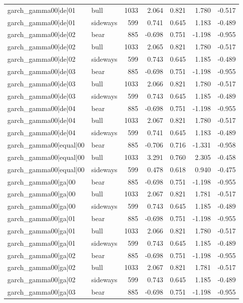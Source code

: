 \begin{table}
\begin{tabular}{llrrrrr}
garch\_gamma00|de|01 & bull & 1033 & 2.064 & 0.821 & 1.780 & -0.517 \\
garch\_gamma00|de|01 & sideways & 599 & 0.741 & 0.645 & 1.183 & -0.489 \\
garch\_gamma00|de|02 & bear & 885 & -0.698 & 0.751 & -1.198 & -0.955 \\
garch\_gamma00|de|02 & bull & 1033 & 2.065 & 0.821 & 1.780 & -0.517 \\
garch\_gamma00|de|02 & sideways & 599 & 0.743 & 0.645 & 1.185 & -0.489 \\
garch\_gamma00|de|03 & bear & 885 & -0.698 & 0.751 & -1.198 & -0.955 \\
garch\_gamma00|de|03 & bull & 1033 & 2.066 & 0.821 & 1.780 & -0.517 \\
garch\_gamma00|de|03 & sideways & 599 & 0.743 & 0.645 & 1.185 & -0.489 \\
garch\_gamma00|de|04 & bear & 885 & -0.698 & 0.751 & -1.198 & -0.955 \\
garch\_gamma00|de|04 & bull & 1033 & 2.067 & 0.821 & 1.780 & -0.517 \\
garch\_gamma00|de|04 & sideways & 599 & 0.741 & 0.645 & 1.183 & -0.489 \\
garch\_gamma00|equal|00 & bear & 885 & -0.706 & 0.716 & -1.331 & -0.958 \\
garch\_gamma00|equal|00 & bull & 1033 & 3.291 & 0.760 & 2.305 & -0.458 \\
garch\_gamma00|equal|00 & sideways & 599 & 0.478 & 0.618 & 0.940 & -0.475 \\
garch\_gamma00|ga|00 & bear & 885 & -0.698 & 0.751 & -1.198 & -0.955 \\
garch\_gamma00|ga|00 & bull & 1033 & 2.067 & 0.821 & 1.781 & -0.517 \\
garch\_gamma00|ga|00 & sideways & 599 & 0.743 & 0.645 & 1.185 & -0.489 \\
garch\_gamma00|ga|01 & bear & 885 & -0.698 & 0.751 & -1.198 & -0.955 \\
garch\_gamma00|ga|01 & bull & 1033 & 2.066 & 0.821 & 1.780 & -0.517 \\
garch\_gamma00|ga|01 & sideways & 599 & 0.743 & 0.645 & 1.185 & -0.489 \\
garch\_gamma00|ga|02 & bear & 885 & -0.698 & 0.751 & -1.198 & -0.955 \\
garch\_gamma00|ga|02 & bull & 1033 & 2.067 & 0.821 & 1.781 & -0.517 \\
garch\_gamma00|ga|02 & sideways & 599 & 0.743 & 0.645 & 1.185 & -0.489 \\
garch\_gamma00|ga|03 & bear & 885 & -0.698 & 0.751 & -1.198 & -0.955 \\

\end{tabular}
\end{table}
